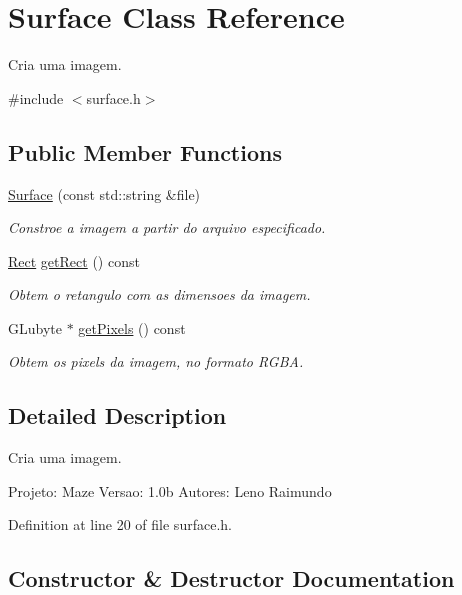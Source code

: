 \hypertarget{class_surface}{}\section{Surface Class Reference}
\label{class_surface}


Cria uma imagem.  




{\ttfamily \#include $<$surface.\+h$>$}

\subsection*{Public Member Functions}
\begin{DoxyCompactItemize}
\item 
\hyperlink{class_surface_ab5df00b6fb0c4ab4dd0008b5c9bbecaf}{Surface} (const std\+::string \&file)
\begin{DoxyCompactList}\small\item\em Constroe a imagem a partir do arquivo especificado. \end{DoxyCompactList}\item 
\hyperlink{class_rect}{Rect} \hyperlink{class_surface_a05ba2f6e9b7a08b1eb3cd0cfdbfd11be}{get\+Rect} () const 
\begin{DoxyCompactList}\small\item\em Obtem o retangulo com as dimensoes da imagem. \end{DoxyCompactList}\item 
G\+Lubyte $\ast$ \hyperlink{class_surface_a9a77f398afab2d8be9f6dd6e9847ca22}{get\+Pixels} () const 
\begin{DoxyCompactList}\small\item\em Obtem os pixels da imagem, no formato R\+G\+B\+A. \end{DoxyCompactList}\end{DoxyCompactItemize}


\subsection{Detailed Description}
Cria uma imagem. 

Projeto\+: Maze Versao\+: 1.\+0b Autores\+: Leno Raimundo 

Definition at line 20 of file surface.\+h.



\subsection{Constructor \& Destructor Documentation}
\hypertarget{class_surface_ab5df00b6fb0c4ab4dd0008b5c9bbecaf}{}
